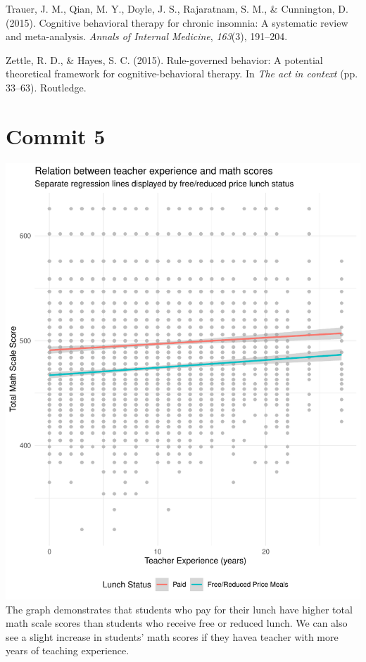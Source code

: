 \documentclass[man]{apa6}
\begin{document}
\hypertarget{refs}{}
\hypertarget{ref-trauer2015CBT}{}
Trauer, J. M., Qian, M. Y., Doyle, J. S., Rajaratnam, S. M., \&
Cunnington, D. (2015). Cognitive behavioral therapy for chronic
insomnia: A systematic review and meta-analysis. \emph{Annals of
Internal Medicine}, \emph{163}(3), 191--204.

\hypertarget{ref-zettle2015}{}
Zettle, R. D., \& Hayes, S. C. (2015). Rule-governed behavior: A
potential theoretical framework for cognitive-behavioral therapy. In
\emph{The act in context} (pp. 33--63). Routledge.

\endgroup

\newpage

\section{Commit 5}\label{commit-5}

\includegraphics{lab_8_files/figure-latex/unnamed-chunk-2-1.pdf}
\newpage
The graph demonstrates that students who pay for their lunch have higher
total math scale scores than students who receive free or reduced lunch.
We can also see a slight increase in students' math scores if they havea
teacher with more years of teaching experience.
\end{document}
